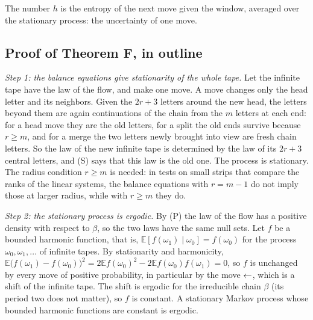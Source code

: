 The number $h$ is the entropy of the next move given the window, averaged over the stationary process: the
uncertainty of one move.

\subsection{Proof of Theorem F, in outline}

\emph{Step 1: the balance equations give stationarity of the whole tape.} Let the infinite tape have the law of the flow,
and make one move. A move changes only the head letter and its neighbors. Given the $2r+3$ letters around the new
head, the letters beyond them are again continuations of the chain from the $m$ letters at each end: for a head move
they are the old letters, for a split the old ends survive because $r\ge m$, and for a merge the two letters newly
brought into view are fresh chain letters. So the law of the new infinite tape is determined by the law of its $2r+3$
central letters, and (S) says that this law is the old one. The process is stationary. The radius condition $r\ge m$
is needed: in tests on small strips that compare the ranks of the linear systems, the balance equations with
$r=m-1$ do not imply those at larger radius, while with $r\ge m$ they do.

\emph{Step 2: the stationary process is ergodic.} By (P) the law of the flow has a positive density with respect to
$\beta$, so the two laws have the same null sets. Let $f$ be a bounded harmonic function, that is,
$\mathbb{E}[f(\omega_1)\mid\omega_0]=f(\omega_0)$ for the process $\omega_0,\omega_1,\ldots$ of infinite tapes. By
stationarity and harmonicity,
$\mathbb{E}\bigl(f(\omega_1)-f(\omega_0)\bigr)^2=2\mathbb{E}f(\omega_0)^2-2\mathbb{E}f(\omega_0)f(\omega_1)=0$, so
$f$ is unchanged by every move of positive probability, in particular by the move $\mathord{\leftarrow}$, which is a shift of the
infinite tape. The shift is ergodic for the irreducible chain $\beta$ (its period two does not matter), so $f$ is
constant. A stationary Markov process whose bounded harmonic functions are constant is ergodic.

